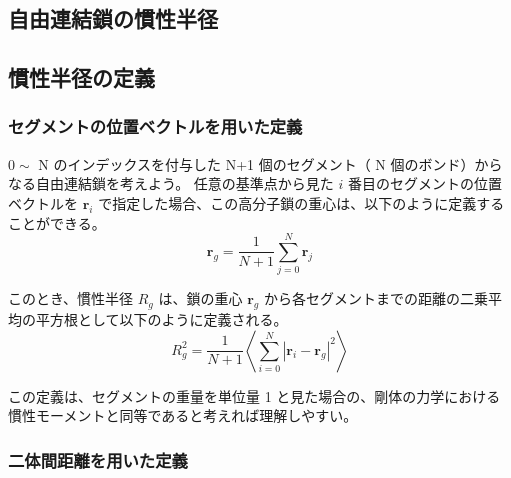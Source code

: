 \documentclass[a4paper,11pt]{ltjsarticle}
\begin{document}
\begin{itemize}
%
%
%

\end{itemize}

\newpage

\begin{appendix}



\newpage

\section{自由連結鎖の慣性半径}
\label{sec:rg}

\subsection{慣性半径の定義}

\subsubsection{セグメントの位置ベクトルを用いた定義}

$0\sim$ N のインデックスを付与した N+1 個のセグメント（ N 個のボンド）からなる自由連結鎖を考えよう。
任意の基準点から見た $i$ 番目のセグメントの位置ベクトルを $\bm{r}_i$ で指定した場合、この高分子鎖の重心は、以下のように定義することができる。
\begin{equation*}
\bm{r}_g = \dfrac{1}{N+1} \sum_{j=0}^{N} \bm{r}_j
\end{equation*}

このとき、慣性半径 $R_g$ は、鎖の重心 $\bm{r}_g$ から各セグメントまでの距離の二乗平均の平方根として以下のように定義される。
\begin{equation*}
R_g^2 = \dfrac{1}{N+1} \left\langle \sum_{i=0}^{N} |\bm{r}_i - \bm{r}_g|^2 \right\rangle
\end{equation*}

この定義は、セグメントの重量を単位量 1 と見た場合の、剛体の力学における慣性モーメントと同等であると考えれば理解しやすい。

\subsubsection{二体間距離を用いた定義}


\end{appendix}
\end{document}
